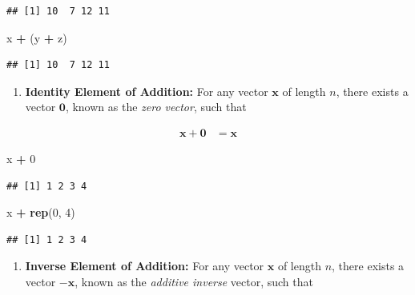 \documentclass[
]{book}
\newenvironment{Shaded}{\begin{snugshade}}{\end{snugshade}}
\newcommand{\DecValTok}[1]{\textcolor[rgb]{0.00,0.00,0.81}{#1}}
\newcommand{\KeywordTok}[1]{\textcolor[rgb]{0.13,0.29,0.53}{\textbf{#1}}}
\newcommand{\NormalTok}[1]{#1}
\newcommand{\OperatorTok}[1]{\textcolor[rgb]{0.81,0.36,0.00}{\textbf{#1}}}
\newcommand{\StringTok}[1]{\textcolor[rgb]{0.31,0.60,0.02}{#1}}
\providecommand{\tightlist}{%
  \setlength{\itemsep}{0pt}\setlength{\parskip}{0pt}}
\theoremstyle{definition}
\theoremstyle{definition}
\theoremstyle{definition}
\theoremstyle{definition}
\theoremstyle{remark}
\begin{document}
\begin{verbatim}
## [1] 10  7 12 11
\end{verbatim}

\begin{Shaded}
\begin{Highlighting}[]
\NormalTok{x }\OperatorTok{+}\StringTok{ }\NormalTok{(y }\OperatorTok{+}\StringTok{ }\NormalTok{z)}
\end{Highlighting}
\end{Shaded}

\begin{verbatim}
## [1] 10  7 12 11
\end{verbatim}

\begin{enumerate}
\def\labelenumi{\arabic{enumi})}
\setcounter{enumi}{5}
\tightlist
\item
  \textbf{Identity Element of Addition:} For any vector \(\mathbf{x}\) of length \(n\), there exists a vector \(\mathbf{0}\), known as the \emph{zero vector}, such that
\end{enumerate}

\[
\begin{aligned}
\mathbf{x} + \mathbf{0} & = \mathbf{x}
\end{aligned}
\]

\begin{Shaded}
\begin{Highlighting}[]
\NormalTok{x }\OperatorTok{+}\StringTok{ }\DecValTok{0}
\end{Highlighting}
\end{Shaded}

\begin{verbatim}
## [1] 1 2 3 4
\end{verbatim}

\begin{Shaded}
\begin{Highlighting}[]
\NormalTok{x }\OperatorTok{+}\StringTok{ }\KeywordTok{rep}\NormalTok{(}\DecValTok{0}\NormalTok{, }\DecValTok{4}\NormalTok{)}
\end{Highlighting}
\end{Shaded}

\begin{verbatim}
## [1] 1 2 3 4
\end{verbatim}

\begin{enumerate}
\def\labelenumi{\arabic{enumi})}
\setcounter{enumi}{6}
\tightlist
\item
  \textbf{Inverse Element of Addition:} For any vector \(\mathbf{x}\) of length \(n\), there exists a vector \(-\mathbf{x}\), known as the \emph{additive inverse} vector, such that
\end{enumerate}
\end{document}
